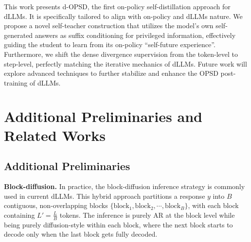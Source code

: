 \documentclass{llmxive}
\begin{document}
This work presents d-OPSD, the first on-policy self-distillation approach for dLLMs. It is specifically tailored to align with on-policy and dLLMs nature. We propose a novel self-teacher construction that utilizes the model's own self-generated answers as suffix conditioning for privileged information, effectively guiding the student to learn from its on-policy ``self-future experience''. Furthermore, we shift the dense divergence supervision from the token-level to step-level, perfectly matching the iterative mechanics of dLLMs. Future work will explore advanced techniques to further stabilize and enhance the OPSD post-training of dLLMs.















\appendix


\section{Additional Preliminaries and Related Works}


\subsection{Additional Preliminaries} \label{app1.1}


\textbf{Block-diffusion. } In practice, the block-diffusion inference strategy \citep{han2023ssd, arriola2025block, fathi2025unifying} is commonly used in current dLLMs. This hybrid approach partitions a response $y$ into $B$ contiguous, non-overlapping blocks $\{\text{block}_1, \text{block}_2, \cdots, \text{block}_B\}$, with each block containing $L' = \frac{L}{B}$ tokens. The inference is purely AR at the block level while being purely diffusion-style within each block, where the next block starts to decode only when the last block gets fully decoded.
\end{document}
